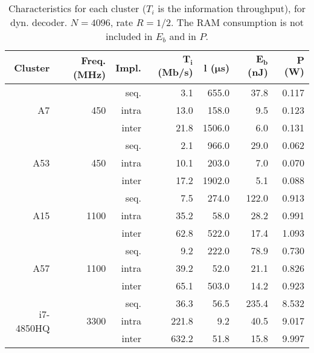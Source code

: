 \begin{table}[htp]
  \caption{Characteristics for each cluster ($T_i$ is the information
    throughput), for dyn. decoder. $N = 4096$, rate $R = 1/2$. The RAM
    consumption is not included in $E_b$ and in $P$.}
  \label{tab:eval_polar_energy_results}
  \begin{center}
  \begin{tabular}{r r r r r r r}
    \textbf{Cluster} &
    \textbf{Freq. (MHz)} &
    \textbf{Impl.} &
    $\boldsymbol{T_i}$ \textbf{(Mb/s)} &
    $\boldsymbol{l}$   \textbf{($\boldsymbol{\mu}$s)} &
    $\boldsymbol{E_b}$ \textbf{(nJ)} &
    $\boldsymbol{P}$   \textbf{(W)}\\
    \hline
    \hline
    \multirow{3}{*}{A7}        & \multirow{3}{*}{ 450} & seq.  &  3.1 &  655.0 &  37.8 & 0.117 \\
                               &                       & intra & 13.0 &  158.0 &   9.5 & 0.123 \\
                               &                       & inter & 21.8 & 1506.0 &   6.0 & 0.131 \\
    \hline
    \multirow{3}{*}{A53}       & \multirow{3}{*}{ 450} & seq.  &  2.1 &  966.0 &  29.0 & 0.062 \\
                               &                       & intra & 10.1 &  203.0 &   7.0 & 0.070 \\
                               &                       & inter & 17.2 & 1902.0 &   5.1 & 0.088 \\
    \hline
    \multirow{3}{*}{A15}       & \multirow{3}{*}{1100} & seq.  &  7.5 &  274.0 & 122.0 & 0.913 \\
                               &                       & intra & 35.2 &   58.0 &  28.2 & 0.991 \\
                               &                       & inter & 62.8 &  522.0 &  17.4 & 1.093 \\
    \hline
    \multirow{3}{*}{A57}       & \multirow{3}{*}{1100} & seq.  &  9.2 &  222.0 &  78.9 & 0.730 \\
                               &                       & intra & 39.2 &   52.0 &  21.1 & 0.826 \\
                               &                       & inter & 65.1 &  503.0 &  14.2 & 0.923 \\
    \hline
    \multirow{3}{*}{i7-4850HQ} & \multirow{3}{*}{3300} & seq.  &  36.3 &   56.5 & 235.4 & 8.532 \\
                               &                       & intra & 221.8 &    9.2 &  40.5 & 9.017 \\
                               &                       & inter & 632.2 &   51.8 &  15.8 & 9.997 \\
  \end{tabular}
  \end{center}
\end{table}

